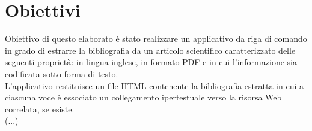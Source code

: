 \section{Obiettivi} 
Obiettivo di questo elaborato è stato realizzare un applicativo da riga di comando in grado di estrarre la bibliografia da un articolo scientifico caratterizzato delle seguenti proprietà: in lingua inglese, in formato PDF e in cui l'informazione sia codificata sotto forma di testo.
\\ 
L'applicativo restituisce un file HTML contenente la bibliografia estratta in cui a ciascuna voce è essociato un collegamento ipertestuale verso la risorsa Web correlata, se esiste.
\\
(...)